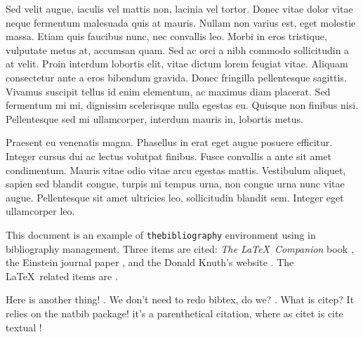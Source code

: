 \documentclass{article}
\begin{document}
Sed velit augue, iaculis vel mattis non, lacinia vel tortor.
Donec vitae dolor vitae neque fermentum malesuada quis at mauris.
Nullam non varius est, eget molestie massa.
Etiam quis faucibus nunc, nec convallis leo.
Morbi in eros tristique, vulputate metus at, accumsan quam.
Sed ac orci a nibh commodo sollicitudin a at velit.
Proin interdum lobortis elit, vitae dictum lorem feugiat vitae.
Aliquam consectetur ante a eros bibendum gravida.
Donec fringilla pellentesque sagittis.
Vivamus suscipit tellus id enim elementum, ac maximus diam placerat.
Sed fermentum mi mi, dignissim scelerisque nulla egestas eu.
Quisque non finibus nisi.
Pellentesque sed mi ullamcorper, interdum mauris in, lobortis metus.


Praesent eu venenatis magna.
Phasellus in erat eget augue posuere efficitur.
Integer cursus dui ac lectus volutpat finibus.
Fusce convallis a ante sit amet condimentum.
Mauris vitae odio vitae arcu egestas mattis.
Vestibulum aliquet, sapien sed blandit congue, turpis mi tempus urna, non congue urna nunc vitae augue.
Pellentesque sit amet ultricies leo, sollicitudin blandit sem.
Integer eget ullamcorper leo.

This document is an example of \texttt{thebibliography} environment using 
in bibliography management. Three items are cited: \textit{The \LaTeX\ Companion} 
book \cite{latexcompanion}, the Einstein journal paper \cite{einstein}, and the 
Donald Knuth's website \cite{knuthwebsite}. The \LaTeX\ related items are
\cite{latexcompanion,knuthwebsite}.

Here is another thing! \cite{einstein}.
We don't need to redo bibtex, do we? \cite{knuthwebsite}.
What is citep? \citep[3]{einstein} It relies on the natbib package!
it's a parenthetical citation, where as citet is cite textual \citet{einstein}!



\end{document}

